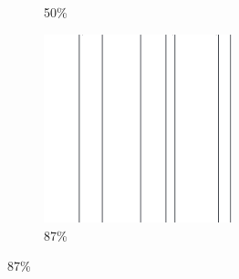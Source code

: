 \documentclass[12pt, fleqn]{report}                             %
\theoremstyle{break}                                            %
\begin{document}
\begin{figure}[ht!]
\begin{subfigure}[b]{0.4\linewidth}
          \caption{50\%}
        \end{subfigure}
        \begin{subfigure}[b]{0.4\linewidth}
          \includegraphics[width=0.6\textwidth]{Images/232/d.png}
          \caption{87\%}
        \end{subfigure}
      \end{figure}
\end{document}
